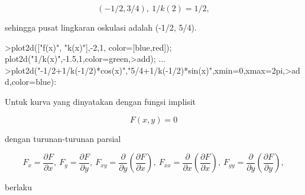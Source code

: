 \documentclass[a4paper,10pt]{article}
\begin{document}
\begin{eulernotebook}
\begin{eulercomment}
\begin{eulercomment}
\begin{eulercomment}
\begin{eulercomment}
\begin{eulercomment}
\begin{eulercomment}
\begin{eulercomment}
\begin{eulercomment}
\begin{eulercomment}
\begin{eulercomment}
\begin{eulercomment}
\begin{eulercomment}
\begin{eulercomment}
\begin{eulercomment}
\begin{eulercomment}
\begin{eulercomment}
\begin{eulercomment}
\begin{eulercomment}
\begin{eulercomment}
\begin{eulercomment}
\begin{eulercomment}
\end{eulercomment}
\begin{eulerformula}
\[
(-1/2,3/4),\ 1/k(2)=1/2,
\]
\end{eulerformula}
\begin{eulercomment}
sehingga pusat lingkaran oskulasi adalah (-1/2, 5/4).
\end{eulercomment}
\begin{eulerprompt}
>plot2d(["f(x)", "k(x)"],-2,1, color=[blue,red]); plot2d("1/k(x)",-1.5,1,color=green,>add); ...
>plot2d("-1/2+1/k(-1/2)*cos(x)","5/4+1/k(-1/2)*sin(x)",xmin=0,xmax=2pi,>add,color=blue):
\end{eulerprompt}
\begin{eulercomment}
Untuk kurva yang dinyatakan dengan fungsi implisit

\end{eulercomment}
\begin{eulerformula}
\[
F(x,y)=0
\]
\end{eulerformula}
\begin{eulercomment}
dengan turunan-turunan parsial

\end{eulercomment}
\begin{eulerformula}
\[
F_x=\frac{\partial F}{\partial x},\ F_y=\frac{\partial F}{\partial y},\ F_{xy}=\frac{\partial}{\partial y}\left(\frac{\partial F}{\partial x}\right),\ F_{xx}=\frac{\partial}{\partial x}\left(\frac{\partial F}{\partial x}\right),\ F_{yy}=\frac{\partial}{\partial y}\left(\frac{\partial F}{\partial y}\right),
\]
\end{eulerformula}
\begin{eulercomment}
berlaku


\end{eulercomment}
\end{eulercomment}
\end{eulercomment}
\end{eulercomment}
\end{eulercomment}
\end{eulercomment}
\end{eulercomment}
\end{eulercomment}
\end{eulercomment}
\end{eulercomment}
\end{eulercomment}
\end{eulercomment}
\end{eulercomment}
\end{eulercomment}
\end{eulercomment}
\end{eulercomment}
\end{eulercomment}
\end{eulercomment}
\end{eulercomment}
\end{eulercomment}
\end{eulercomment}
\end{eulernotebook}
\end{document}
